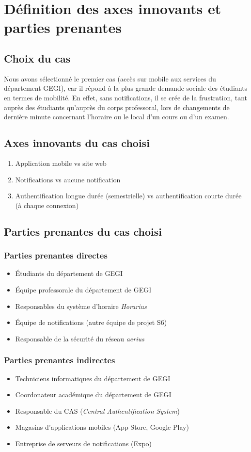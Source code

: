 \section{Définition des axes innovants et parties prenantes}
	\subsection{Choix du cas}
	Nous avons sélectionné le premier cas (accès sur mobile aux services du département GEGI), car il répond à la plus grande demande sociale des étudiants en termes de mobilité. En effet, sans notifications, il se crée de la frustration, tant auprès des étudiants qu'auprès du corps professoral, lors de changements de dernière minute concernant l'horaire ou le local d'un cours ou d'un examen.
	
	\subsection{Axes innovants du cas choisi}
	\begin{enumerate}
		\item Application mobile vs site web
		\item Notifications vs aucune notification
		\item Authentification longue durée (semestrielle) vs authentification courte durée (à chaque connexion)
	\end{enumerate}
	
	\subsection{Parties prenantes du cas choisi}
		\subsubsection{Parties prenantes directes}
		\begin{itemize}
			\item Étudiants du département de GEGI
			\item Équipe professorale du département de GEGI
			\item Responsables du système d'horaire \emph{Horarius}
			\item Équipe de notifications (autre équipe de projet S6)
			\item Responsable de la sécurité du réseau \emph{aerius}
		\end{itemize}
		
		\subsubsection{Parties prenantes indirectes}
		\begin{itemize}
			\item Techniciens informatiques du département de GEGI
			\item Coordonateur académique du département de GEGI
			\item Responsable du CAS (\emph{Central Authentification System})
			\item Magasins d'applications mobiles (App Store, Google Play)
			\item Entreprise de serveurs de notifications (Expo)
		\end{itemize}
	